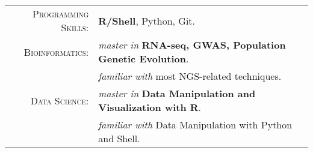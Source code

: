 %
%


 
\renewcommand{\arraystretch}{1.1}

	\begin{tabular}{>{}r>{}p{13cm}} 
		\textsc{Programming Skills:}    &  \textbf{R/Shell}, Python, Git.\\  
		\textsc{Bioinformatics:} 		&  \emph{master in} \textbf{RNA-seq, GWAS, Population Genetic Evolution}.\\
										&  \emph{familiar with} most  NGS-related techniques.\\
		\textsc{Data Science:}          &  \emph{master in} \textbf{Data Manipulation and Visualization with R}.\\
										&  \emph{familiar with} Data Manipulation with Python and Shell.\\
	\end{tabular}
